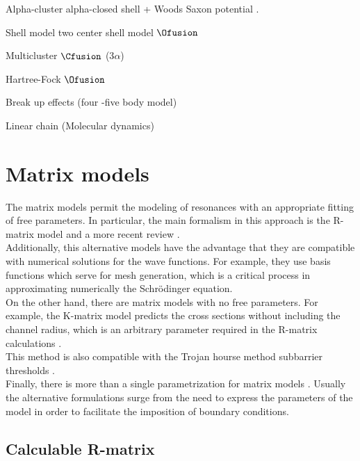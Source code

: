 \documentclass[openany]{book}
\begin{document}
Alpha-cluster alpha-closed shell + Woods Saxon potential  \cite{bai_ren_2018}.

Shell model \cite{dong_wang_michel_ploszajczak_2022} two center shell model $\Ofusion$ \cite{tazawa_1974}

Multicluster $\Cfusion$ (3$\alpha$) \cite{dufour_descouvemont_1997}

Hartree-Fock $\Ofusion$ \cite{simenel_keser_umar_oberacker_2013}

Break up effects (four -five body model)\cite{shubhchintak_descouvemont_2022}

Linear chain (Molecular dynamics) \cite{baba_taniguchi_kimura_2022}

\section{Matrix models}  \label{sec:matrixModels}

The matrix models permit the modeling of resonances with an appropriate fitting of free parameters. In particular, the main formalism in this approach is the R-matrix model \cite{lane_thomas_1958} and a more recent review \cite{descouvemont_baye_2010}. \\

Additionally, this alternative models have the advantage that they are compatible with numerical solutions for the wave functions. For example, they use basis functions which serve for mesh generation, which is a critical process in approximating numerically the Schrödinger equation. \\

On the other hand, there are matrix models with no free parameters. For example, the K-matrix model predicts the cross sections without including the channel radius, which is an arbitrary parameter required in the R-matrix calculations \cite{humblet_1990}. \\

This method is also compatible with the Trojan hourse method subbarrier thresholds \cite{mukhamedzhanov_shubhchintak_bertulani_2017}. \\

Finally, there is more than a single parametrization for matrix models \cite{brune_2002}. Usually the alternative formulations surge from the need to express the parameters of the model in order to facilitate the imposition of boundary conditions.  

\subsection{Calculable R-matrix} \label{sub:rmatrix_calculable}
\end{document}

